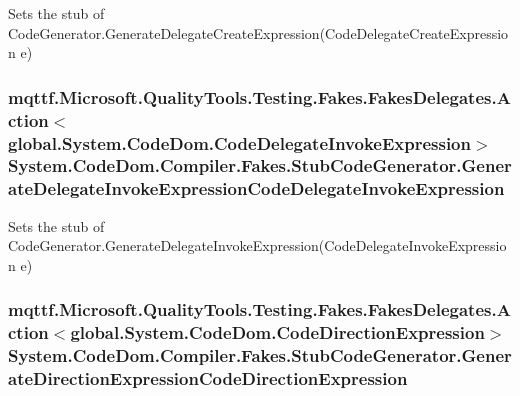 Sets the stub of Code\-Generator.\-Generate\-Delegate\-Create\-Expression(\-Code\-Delegate\-Create\-Expression e)

\hypertarget{class_system_1_1_code_dom_1_1_compiler_1_1_fakes_1_1_stub_code_generator_a5c1e1392da65f6584b0e13d5377a44ea}{
\subsubsection[{Generate\-Delegate\-Invoke\-Expression\-Code\-Delegate\-Invoke\-Expression}]{\setlength{\rightskip}{0pt plus 5cm}mqttf.\-Microsoft.\-Quality\-Tools.\-Testing.\-Fakes.\-Fakes\-Delegates.\-Action$<$global.\-System.\-Code\-Dom.\-Code\-Delegate\-Invoke\-Expression$>$ System.\-Code\-Dom.\-Compiler.\-Fakes.\-Stub\-Code\-Generator.\-Generate\-Delegate\-Invoke\-Expression\-Code\-Delegate\-Invoke\-Expression}}\label{class_system_1_1_code_dom_1_1_compiler_1_1_fakes_1_1_stub_code_generator_a5c1e1392da65f6584b0e13d5377a44ea}


Sets the stub of Code\-Generator.\-Generate\-Delegate\-Invoke\-Expression(\-Code\-Delegate\-Invoke\-Expression e)

\hypertarget{class_system_1_1_code_dom_1_1_compiler_1_1_fakes_1_1_stub_code_generator_a65a59d49c32c51137ccf2516397ff3c0}{
\subsubsection[{Generate\-Direction\-Expression\-Code\-Direction\-Expression}]{\setlength{\rightskip}{0pt plus 5cm}mqttf.\-Microsoft.\-Quality\-Tools.\-Testing.\-Fakes.\-Fakes\-Delegates.\-Action$<$global.\-System.\-Code\-Dom.\-Code\-Direction\-Expression$>$ System.\-Code\-Dom.\-Compiler.\-Fakes.\-Stub\-Code\-Generator.\-Generate\-Direction\-Expression\-Code\-Direction\-Expression}}\label{class_system_1_1_code_dom_1_1_compiler_1_1_fakes_1_1_stub_code_generator_a65a59d49c32c51137ccf2516397ff3c0}



